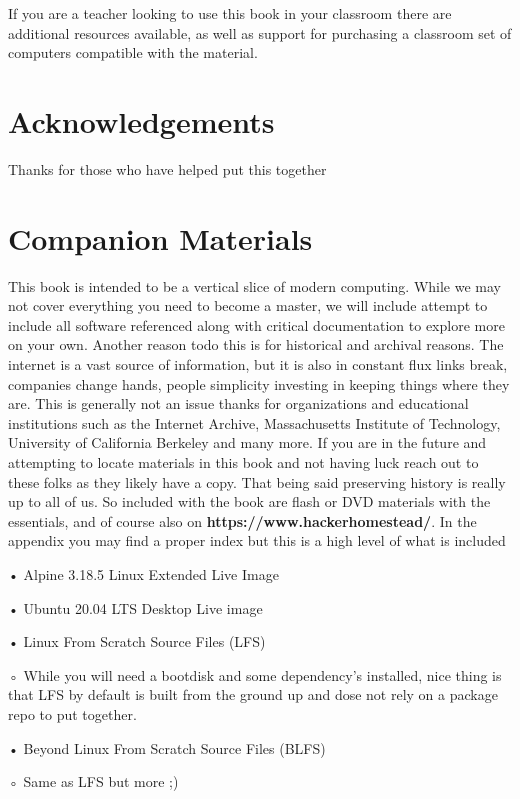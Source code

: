 If you are a teacher looking to use this book in your classroom there are additional resources available, as well as support for purchasing a classroom set of computers compatible with the material.

\section{Acknowledgements}

Thanks for those who have helped put this together

\section{Companion Materials}

This book is intended to be a vertical slice of modern computing. While we may not cover everything you need to become a master, we will include attempt to include all software referenced along with critical documentation to explore more on your own. Another reason todo this is for historical and archival reasons.  The internet is a vast source of information, but it is also in constant flux links break, companies change hands, people simplicity investing in keeping things where they are. This is generally not an issue thanks for organizations and educational institutions such as the Internet Archive, Massachusetts Institute of Technology, University of California Berkeley and many more. If you are in the future and attempting to locate materials in this book and not having luck reach out to these folks as they likely have a copy. That being said preserving history is really up to all of us. So included with the book are flash or DVD materials with the essentials, and of course also on \textbf{https://www.hackerhomestead/}.
In the appendix you may find a proper index but this is a high level of what is included

    • Alpine  3.18.5 Linux Extended Live Image

    • Ubuntu 20.04 LTS Desktop Live image

    • Linux From Scratch Source Files (LFS)

        ◦ While you will need a bootdisk and some dependency's installed, nice thing is that LFS by default is built from the ground up and dose not rely on a package repo to put together. 

    • Beyond Linux From Scratch Source Files (BLFS)

        ◦ Same as LFS but more ;) 

